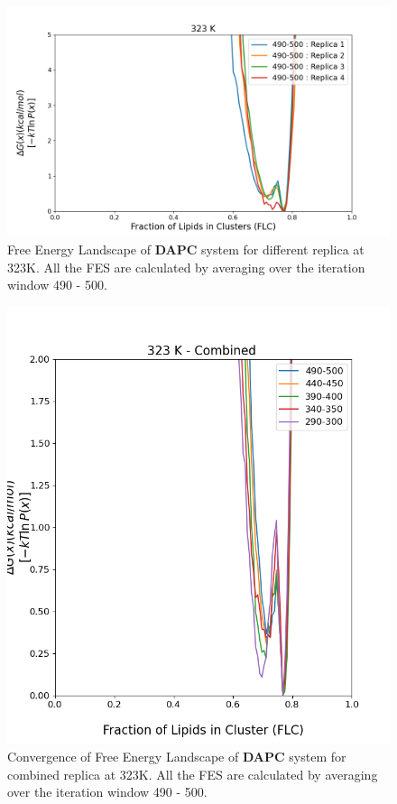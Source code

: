 \documentclass{biophys-new}
\begin{document}

\begin{figure}[hbt!]
\centering
\includegraphics[width=1.1\linewidth]{all_plots/ClusterLipids2Total/DPPC_DAPC_CHOL/323K/Average_DAPC_323_ClusterLipids2Total.png}
\caption{Free Energy Landscape of \textbf{DAPC} system for different replica at 323K. All the FES are calculated by averaging over the iteration window 490 - 500.}
\label{fig:view}

\end{figure}

\begin{figure}[hbt!]
\centering
\includegraphics[width=0.6\linewidth]{all_plots/ClusterLipids2Total/DPPC_DAPC_CHOL/323K/Convergence_DAPC_MULTI__323_ClusterLipids2Total.png}
\caption{Convergence of Free Energy Landscape of \textbf{DAPC} system for combined replica at 323K. All the FES are calculated by averaging over the iteration window 490 - 500.}
\label{fig:view}

\end{figure}
\end{document}
